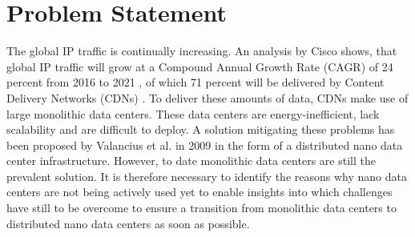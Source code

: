 \documentclass[sigchi-a, authorversion]{acmart}
\begin{document}
\maketitle

%  
%  
%  
%


\section{Problem Statement} %
The global IP traffic is continually increasing. An analysis by Cisco shows, that global IP traffic will grow at a Compound Annual Growth Rate (CAGR) of 24 percent from 2016 to 2021 \cite{TheZetta68:online}, of which 71 percent will be delivered by Content Delivery Networks (CDNs) \cite{TheZetta68:online}. To deliver these amounts of data, CDNs make use of large monolithic data centers. These data centers are energy-inefficient, lack scalability and are difficult to deploy. \cite{DBLP:conf/conext/ValanciusLMDR09} A solution mitigating these problems has been proposed by Valancius et al. in 2009 \cite{DBLP:conf/conext/ValanciusLMDR09} in the form of a distributed nano data center infrastructure. However, to date monolithic data centers are still the prevalent solution. It is therefore necessary to identify the reasons why nano data centers are not being actively used yet to enable insights into which challenges have still to be overcome to ensure a transition from monolithic data centers to distributed nano data centers as soon as possible.
\end{document}
